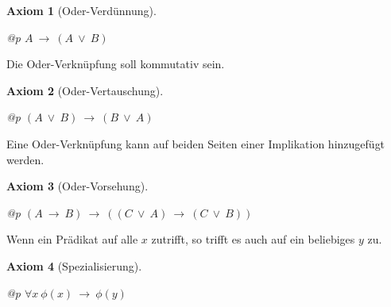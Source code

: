\documentclass[a4paper,german,10pt,twoside]{book}
\newtheorem{ax}{Axiom}
\theoremstyle{definition}
\theoremstyle{remark}
\begin{document}
\begin{ax}[Oder-Verd{\"u}nnung]
\label{axiom:disjunction_weakening} \hypertarget{axiom:disjunction_weakening}{}
\mbox{}
\begin{longtable}{{@{\extracolsep{\fill}}p{\linewidth}}}
\centering $A\ \rightarrow \ (A\ \lor \ B)$
\end{longtable}

\end{ax}




\par
Die Oder-Verkn{\"u}pfung soll kommutativ sein.

\begin{ax}[Oder-Vertauschung]
\label{axiom:disjunction_commutative} \hypertarget{axiom:disjunction_commutative}{}
\mbox{}
\begin{longtable}{{@{\extracolsep{\fill}}p{\linewidth}}}
\centering $(A\ \lor \ B)\ \rightarrow \ (B\ \lor \ A)$
\end{longtable}

\end{ax}




\par
Eine Oder-Verkn{\"u}pfung kann auf beiden Seiten einer Implikation 
hinzugef{\"u}gt werden.

\begin{ax}[Oder-Vorsehung]
\label{axiom:disjunction_addition} \hypertarget{axiom:disjunction_addition}{}
\mbox{}
\begin{longtable}{{@{\extracolsep{\fill}}p{\linewidth}}}
\centering $(A\ \rightarrow \ B)\ \rightarrow \ ((C\ \lor \ A)\ \rightarrow \ (C\ \lor \ B))$
\end{longtable}

\end{ax}




\par
Wenn ein Pr{\"a}dikat auf alle $x$ zutrifft, so trifft es auch auf ein beliebiges $y$ zu.

\begin{ax}[Spezialisierung]
\label{axiom:universalInstantiation} \hypertarget{axiom:universalInstantiation}{}
\mbox{}
\begin{longtable}{{@{\extracolsep{\fill}}p{\linewidth}}}
\centering $\forall x\ \phi(x)\ \rightarrow \ \phi(y)$
\end{longtable}

\end{ax}
\end{document}
